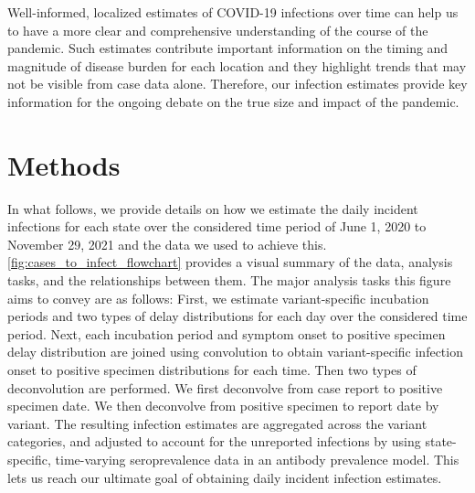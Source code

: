 \documentclass{article}
\begin{document}
Well-informed, localized estimates of COVID-19 infections over time can help us
to have a more clear and comprehensive understanding of the course of the
pandemic. Such estimates contribute important information on the timing and
magnitude of disease burden for each location and they highlight trends that may
not be visible from case data alone. Therefore, our infection estimates provide
key information for the ongoing debate on the true size and impact of the
pandemic.

\section{Methods}


In what follows, we provide details on how we estimate the daily incident
infections for each state over the considered time period of June 1, 2020 to
November 29, 2021 and the data we used to achieve this. 
\autoref{fig:cases_to_infect_flowchart} provides a visual summary of the data,
analysis tasks, and the relationships between them. The major analysis tasks
this figure aims to convey are as follows: First, we estimate variant-specific
incubation periods and two types of delay distributions for each day over the
considered time period. Next, each incubation period and symptom onset to
positive specimen delay distribution are joined using convolution to obtain
variant-specific infection onset to positive specimen distributions for each
time. Then two types of deconvolution are performed. We first deconvolve from
case report to positive specimen date. We then deconvolve from positive specimen
to report date by variant. The resulting infection estimates are aggregated
across the variant categories, and adjusted to account for the unreported
infections by using state-specific, time-varying seroprevalence data in an
antibody prevalence model. This lets us reach our ultimate goal of obtaining
daily incident infection estimates.
\end{document}
